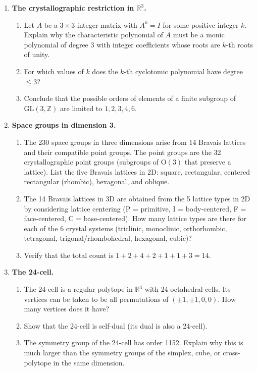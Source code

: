 \begin{enumerate}
    \item \textbf{The crystallographic restriction in $\mathbb{R}^3$.}
    \begin{enumerate}
        \item Let $A$ be a $3 \times 3$ integer matrix with $A^k = I$ for some positive integer $k$. Explain why the characteristic polynomial of $A$ must be a monic polynomial of degree 3 with integer coefficients whose roots are $k$-th roots of unity.
        \item For which values of $k$ does the $k$-th cyclotomic polynomial have degree $\leq 3$?
        \item Conclude that the possible orders of elements of a finite subgroup of $\mathrm{GL}(3, \mathbb{Z})$ are limited to $1, 2, 3, 4, 6$.
    \end{enumerate}

    \item \textbf{Space groups in dimension 3.}
    \begin{enumerate}
        \item The 230 space groups in three dimensions arise from 14 Bravais lattices and their compatible point groups. The point groups are the 32 crystallographic point groups (subgroups of $\mathrm{O}(3)$ that preserve a lattice). List the five Bravais lattices in 2D: square, rectangular, centered rectangular (rhombic), hexagonal, and oblique.
        \item The 14 Bravais lattices in 3D are obtained from the 5 lattice types in 2D by considering lattice centering (P = primitive, I = body-centered, F = face-centered, C = base-centered). How many lattice types are there for each of the 6 crystal systems (triclinic, monoclinic, orthorhombic, tetragonal, trigonal/rhombohedral, hexagonal, cubic)?
        \item Verify that the total count is $1 + 2 + 4 + 2 + 1 + 1 + 3 = 14$.
    \end{enumerate}

    \item[$\star$] \textbf{The 24-cell.}
    \begin{enumerate}
        \item The 24-cell is a regular polytope in $\mathbb{R}^4$ with 24 octahedral cells. Its vertices can be taken to be all permutations of $(\pm 1, \pm 1, 0, 0)$. How many vertices does it have?
        \item Show that the 24-cell is self-dual (its dual is also a 24-cell).
        \item The symmetry group of the 24-cell has order 1152. Explain why this is much larger than the symmetry groups of the simplex, cube, or cross-polytope in the same dimension.
    \end{enumerate}


\end{enumerate}

